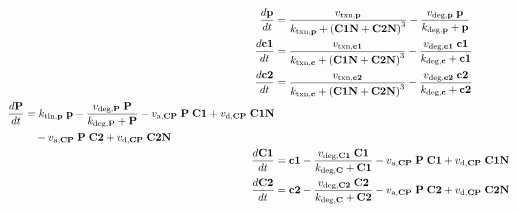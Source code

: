\begin{table}[h]
  \centering
  \begin{minipage}{5in}

    \begin{align}
      \label{eq:p}
      \frac{d\mathrm{\bf p}}{dt}    & = \frac{v_{\text{txn,{\bf p}}}}{k_{\text{txn,{\bf p}}} + \left(\text{\bf C1N} + \text{\bf C2N} \right)^3} - \frac{v_{\text{deg,{\bf p}}} \;\text{\bf p} }{k_{\text{deg,{\bf p}}} +\text{\bf p} } \\
      \label{eq:c1}
      \frac{d\text{\bf c1}}{dt}   & = \frac{v_{\text{txn,{\bf c1}}}}{k_{\text{txn,{\bf c}}} + \left(\text{\bf C1N} + \text{\bf C2N} \right)^3} - \frac{v_{\text{deg,{\bf c1}}} \;\text{\bf c1} }{k_{\text{deg,{\bf c}}} +\text{\bf c1} } \\
      \label{eq:c2}
      \frac{d\text{\bf c2}}{dt}   & = \frac{v_{\text{txn,{\bf c2}}}}{k_{\text{txn,{\bf c}}} + \left(\text{\bf C1N} + \text{\bf C2N} \right)^3} - \frac{v_{\text{deg,{\bf c2}}} \;\text{\bf c2} }{k_{\text{deg,{\bf c}}} +\text{\bf c2} } \\
      \begin{split}
        \frac{d\text{\bf P}}{dt}  & = k_\text{tln,{\bf p}} \;\text{\bf p}  - \frac{v_{\text{deg,{\bf P}}} \;\text{\bf P} }{k_{\text{deg,{\bf P}}} +\text{\bf P} } - v_{\text{a,{\bf CP}}} \;\text{\bf P}  \;\text{\bf C1}  + v_{\text{d,{\bf CP}}} \;\text{\bf C1N} \\
                                  & \quad - v_{\text{a,{\bf CP}}} \;\text{\bf P}  \;\text{\bf C2}  + v_{\text{d,{\bf CP}}} \; \text{\bf C2N}
      \end{split} \\
      \frac{d\text{\bf C1}}{dt}   & =\text{\bf c1}  - \frac{v_{\text{deg,{\bf C1}}} \;\text{\bf C1} }{k_{\text{deg,{\bf C}}} +\text{\bf C1} } - v_{\text{a,{\bf CP}}} \;\text{\bf P}  \;\text{\bf C1}  + v_{\text{d,{\bf CP}}} \;\text{\bf C1N} \\
      \frac{d\text{\bf C2}}{dt}   & =\text{\bf c2} - \frac{ v_{\text{deg,{\bf C2}}} \;\text{\bf C2} }{k_{\text{deg,{\bf C}}} +\text{\bf C2} } - v_{\text{a,{\bf CP}}} \;\text{\bf P}  \;\text{\bf C2}  + v_{\text{d,{\bf CP}}} \; \text{\bf C2N} \\

\end{align}
\end{minipage}
\end{table}
